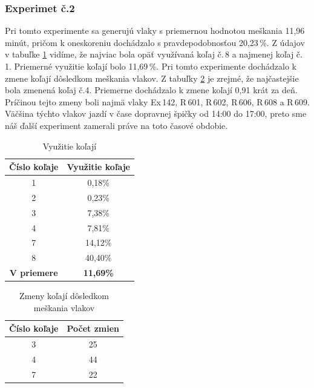 \documentclass[12pt,a4paper,titlepage,final]{article}
\begin{document}
\subsubsection{Experimet č.2}

Pri tomto experimente sa generujú vlaky s priemernou hodnotou meškania 11,96 minút, pričom k oneskoreniu dochádzalo s pravdepodobnosťou 20,23\,\%. Z údajov v tabuľke \ref{tab2} vidíme, že najviac bola opäť využívaná koľaj č.\,8 a najmenej koľaj č.\,1. Priemerné využitie koľají bolo 11,69\,\%. Pri tomto experimente dochádzalo k zmene koľají dôsledkom meškania vlakov. Z tabuľky \ref{tab3} je zrejmé, že najčastejšie bola zmenená koľaj č.4. Priemerne dochádzalo k zmene koľají 0,91 krát za deň. Príčinou tejto zmeny boli najmä vlaky Ex\,142, R\,601, R\,602, R\,606, R\,608 a R\,609. Väčšina týchto vlakov jazdí v čase dopravnej špičky od 14:00 do 17:00, preto sme náš ďalší experiment zamerali práve na toto časové obdobie.

\begin{table}[h]
\centering
\begin{center}
\begin{tabular}{| c | c |}
\hline
{\textbf{Číslo koľaje}} & {\textbf{Využitie koľaje}} \\
\hline
1 & 0,18\% \\
2 & 0,23\% \\
3 & 7,38\% \\
4 & 7,81\% \\
7 & 14,12\% \\
8 & 40,40\% \\
\hline
{\textbf{V priemere}} & {\textbf{11,69\%}} \\
\hline
\end{tabular}
\caption{Využitie koľají}
\label{tab2}
\end{center}
\end{table}

\begin{table}[h]
\centering
\begin{center}
\begin{tabular}{| c | c |}
\hline
{\textbf{Číslo koľaje}} & {\textbf{Počet zmien}} \\
\hline
3 & 25 \\
4 & 44 \\
7 & 22 \\
\hline
\end{tabular}
\caption{Zmeny koľají dôsledkom meškania vlakov}
\label{tab3}
\end{center}
\end{table}
\end{document}
